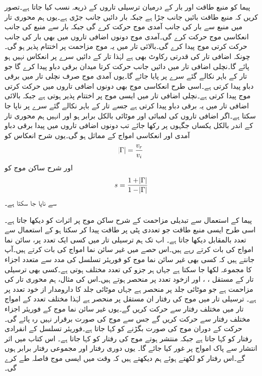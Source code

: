 پیما کو منبع طاقت اور بار کے درمیان ترسیلی تاروں کے ذریعہ نسب کیا جاتا ہے۔تصور کریں کہ منبع طاقت بائیں جانب جڑا ہے جبکہ بار دائیں جانب جڑی ہے۔یوں ہم محوری تار میں منبع سے بار کی جانب آمدی موج حرکت کرے گی جبکہ بار سے منبع کی جانب انعکاسی موج حرکت کرے گی۔آمدی موج دونوں اضافی تاروں میں بھی بار کی جانب حرکت کرتی موج پیدا کرے گی۔بالائی تار میں یہ موج مزاحمت  پر اختتام پذیر ہو گی۔چونکہ اضافی تار کی قدرتی رکاوٹ بھی  ہے لہٰذا تار کے دائیں سرے پر انعکاس نہیں ہو پائے گا۔نچلی اضافی تار میں دائیں جانب حرکت کرتا میدان  برقی دباو  پیدا کرے گا جو تار کے باہر نکالے گئے سرے پر پایا جائے گا۔یوں آمدی موج صرف نچلی تار میں برقی دباو پیدا کرتی ہے۔اسی طرح انعکاسی موج بھی دونوں اضافی تاروں میں حرکت کرتی موج پیدا کرتی ہے۔نچلی اضافی تار میں ایسی موج  پر اختتام پذیر ہوتی ہے جبکہ بالائی اضافی تار میں یہ  برقی دباو پیدا کرتی ہے جسے تار کے باہر نکالے گئے سرے پر ناپا جا سکتا ہے۔اگر اضافی تاروں کی لمبائی اور موٹائی بالکل برابر ہو اور انہیں ہم محوری تار کے اندر بالکل یکساں جگہوں پر رکھا جائے تب دونوں اضافی تاروں میں پیدا برقی دباو آمدی اور انعکاسی امواج کے مماثل ہو گی۔یوں شرح انعکاس کو
\begin{align}
\abs{\Gamma}=\frac{v_r}{v_i}
\end{align}
اور شرح ساکن موج کو
\begin{align}
s=\frac{1+\abs{\Gamma}}{1-\abs{\Gamma}}
\end{align}
سے ناپا جا سکتا ہے۔

پیما کے استعمال سے  تبدیلی مزاحمت کے شرح ساکن موج پر اثرات کو دیکھا جاتا ہے۔اسی طرح ایسی منبع طاقت جو تعددی پٹی پر طاقت پیدا کر سکتا ہو کے استعمال سے تعدد بالمقابل  دیکھا جاتا ہے۔
اب تک ہم  ترسیلی تار میں کسی ایک تعدد پر،  سائن نما امواج کی بات کرتے رہے ہیں۔اس حصے میں غیر سائن نما امواج کی بات کرتے ہیں۔آپ جانتے ہیں کہ کسی بھی غیر سائن نما موج کو فوریئر تسلسل کی مدد سے متعدد اجزاء کا مجموعہ لکھا جا سکتا ہے جہاں ہر جزو کی تعدد مختلف ہوتی ہے۔کسی بھی ترسیلی تار کے مستقل ، ،  اور  ازخود تعدد پر منحصر ہوتے ہیں۔اس کی مثال، ہم محوری تار کی مزاحمت ہے جو موٹائی جلد پر منحصر ہے جہاں موٹائی جلد کا دارومدار از خود تعدد پر ہے۔ ترسیلی تار میں موج کی رفتار ان مستقل پر منحصر ہے لہٰذا مختلف تعدد کے امواج تار میں مختلف رفتار سے حرکت کریں گے۔یوں غیر سائن نما موج کے فوریئر اجزاء مختلف رفتار سے حرکت کریں گے جس سے موج کی صورت برقرار نہیں رہ پائے گی۔حرکت کے دوران موج کی صورت بگڑنے کو  کہا جاتا ہے۔فوریئر تسلسل کے انفرادی رفتار  کو  کہا جاتا ہے جبکہ منتشر ہوتے موج کی رفتار  کو  کہا جاتا ہے۔ اس کتاب میں اثر انتشار سے پاک امواج پر غور کیا جائے گا۔ یوں دوری رفتار اور مجموعی رفتار برابر ہوں گے۔اس رفتار کو  لکھتے ہوئے ہم دیکھتے ہیں کہ وقت  میں ایسی موج   فاصلہ طے کرے گی۔

